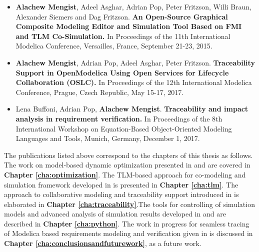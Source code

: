 \begin{itemize}
\item[\begin{NoHyper} \cite{alachewtlm} \end{NoHyper}]  \textbf{Alachew Mengist}, Adeel Asghar, Adrian Pop, Peter Fritzson, Willi Braun, Alexander Siemers and Dag Fritzson.\textbf{ An Open-Source Graphical Composite Modeling Editor and Simulation Tool Based on FMI and TLM Co-Simulation.} In Proceedings of the 11th International Modelica Conference, Versailles, France, September 21-23, 2015. 


\item[\begin{NoHyper} \cite{alachewtraceability} \end{NoHyper}]  \textbf{Alachew Mengist}, Adrian Pop, Adeel Asghar, Peter Fritzson. \textbf{Traceability Support in OpenModelica Using Open Services for Lifecycle Collaboration (OSLC).} In Proceedings of the 12th International Modelica Conference, Prague, Czech Republic, May 15-17, 2017. 

\item[\begin{NoHyper} \cite{alachewrequirementstraceability} \end{NoHyper}]  Lena Buffoni, Adrian Pop, \textbf{Alachew Mengist}. \textbf{Traceability and impact analysis in requirement verification.} In Proceedings of the 8th International Workshop on Equation-Based Object-Oriented Modeling Languages and Tools, Munich, Germany, December 1, 2017. 

\end{itemize}

The publications listed above correspond to the chapters of this thesis as follows. The work on model-based dynamic optimization presented in \cite{alachewoptimization} and \cite{alachewoptimizationdemo} are covered in  \textbf{Chapter \ref{cha:optimization}}. The TLM-based approach for co-modeling and simulation framework developed in \cite{alachewtlm} is presented in \textbf{Chapter \ref{cha:tlm}}. The approach to collaborative modeling and traceability support introduced in \cite{alachewtraceability} is elaborated in \textbf{Chapter \ref{cha:traceability}}.The tools for controlling of simulation models and advanced analysis of simulation results developed in \cite{alachewompython} and \cite{alachewpysimulator} are described in \textbf{Chapter \ref{cha:python}}.  The work in progress for seamless tracing of Modelica based requirements modeling and verification given in \cite{alachewrequirementstraceability} is discussed in \textbf{Chapter \ref{cha:conclusionsandfuturework}}, as a future work.


